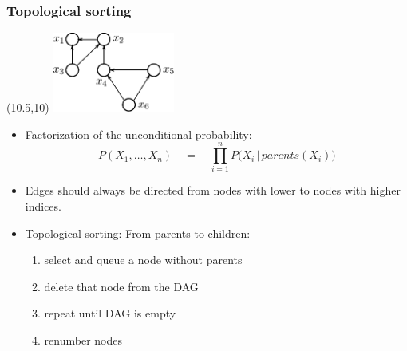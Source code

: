 \begin{frame} \frametitle{Topological sorting}
	\begin{textblock}{}(10.5,10)
		\includegraphics[width=4cm]{img/section3_fig17}
	\end{textblock}

	\begin{itemize}
		\item Factorization of the unconditional probability:
		$$
				P(X_1,\ldots, X_n) \quad=\quad 
				{\textstyle\prod\limits_{i=1}^n} P\big(X_i\,|\,parents(X_i)\big)
		$$
		\vspace{4mm}
		\item Edges should always be directed from nodes with lower 
			to nodes with higher indices.
		\vspace{8mm}
		\item Topological sorting: From parents to children:
			\begin{enumerate}
				\item select and queue a node without parents
				\item delete that node from the DAG
				\item repeat until DAG is empty
				\item renumber nodes
			\end{enumerate}
		
	\end{itemize}
\end{frame}


